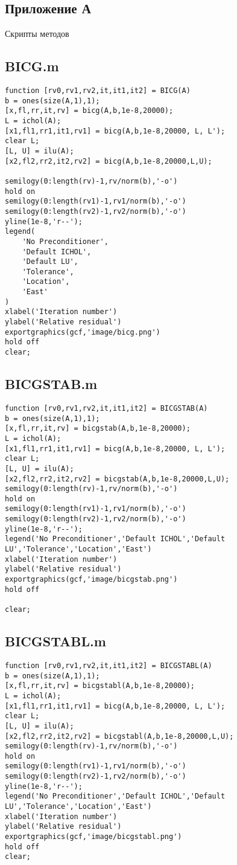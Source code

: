 \begin{center}
    \section*{Приложение А}
    Скрипты методов
\end{center}

\subsection*{BICG.m}
\begin{lstlisting}
function [rv0,rv1,rv2,it,it1,it2] = BICG(A)
b = ones(size(A,1),1);
[x,fl,rr,it,rv] = bicg(A,b,1e-8,20000);
L = ichol(A);
[x1,fl1,rr1,it1,rv1] = bicg(A,b,1e-8,20000, L, L');
clear L;
[L, U] = ilu(A);
[x2,fl2,rr2,it2,rv2] = bicg(A,b,1e-8,20000,L,U);

semilogy(0:length(rv)-1,rv/norm(b),'-o')
hold on
semilogy(0:length(rv1)-1,rv1/norm(b),'-o')
semilogy(0:length(rv2)-1,rv2/norm(b),'-o')
yline(1e-8,'r--');
legend(
    'No Preconditioner',
    'Default ICHOL',
    'Default LU',
    'Tolerance',
    'Location',
    'East'
)
xlabel('Iteration number')
ylabel('Relative residual')
exportgraphics(gcf,'image/bicg.png')
hold off
clear;
\end{lstlisting}

\subsection*{BICGSTAB.m}
\begin{lstlisting}
function [rv0,rv1,rv2,it,it1,it2] = BICGSTAB(A)
b = ones(size(A,1),1);
[x,fl,rr,it,rv] = bicgstab(A,b,1e-8,20000);
L = ichol(A);
[x1,fl1,rr1,it1,rv1] = bicg(A,b,1e-8,20000, L, L');
clear L;
[L, U] = ilu(A);
[x2,fl2,rr2,it2,rv2] = bicgstab(A,b,1e-8,20000,L,U);
semilogy(0:length(rv)-1,rv/norm(b),'-o')
hold on
semilogy(0:length(rv1)-1,rv1/norm(b),'-o')
semilogy(0:length(rv2)-1,rv2/norm(b),'-o')
yline(1e-8,'r--');
legend('No Preconditioner','Default ICHOL','Default LU','Tolerance','Location','East')
xlabel('Iteration number')
ylabel('Relative residual')
exportgraphics(gcf,'image/bicgstab.png')
hold off

clear;
\end{lstlisting}

\subsection*{BICGSTABL.m}
\begin{lstlisting}
function [rv0,rv1,rv2,it,it1,it2] = BICGSTABL(A)
b = ones(size(A,1),1);
[x,fl,rr,it,rv] = bicgstabl(A,b,1e-8,20000);
L = ichol(A);
[x1,fl1,rr1,it1,rv1] = bicg(A,b,1e-8,20000, L, L');
clear L;
[L, U] = ilu(A);
[x2,fl2,rr2,it2,rv2] = bicgstabl(A,b,1e-8,20000,L,U);
semilogy(0:length(rv)-1,rv/norm(b),'-o')
hold on
semilogy(0:length(rv1)-1,rv1/norm(b),'-o')
semilogy(0:length(rv2)-1,rv2/norm(b),'-o')
yline(1e-8,'r--');
legend('No Preconditioner','Default ICHOL','Default LU','Tolerance','Location','East')
xlabel('Iteration number')
ylabel('Relative residual')
exportgraphics(gcf,'image/bicgstabl.png')
hold off
clear;
\end{lstlisting}

